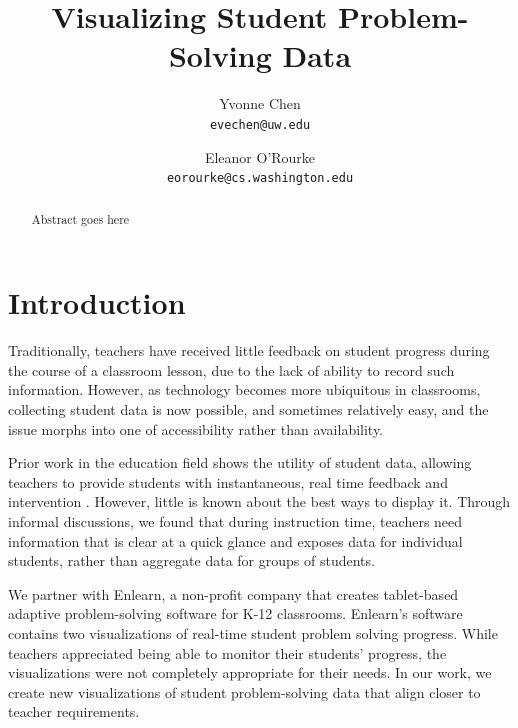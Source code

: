 \documentclass{sigchi}
\begin{document}
\author{
  Yvonne Chen\\
  \texttt{evechen@uw.edu}
  \and
  Eleanor O'Rourke\\
  \texttt{eorourke@cs.washington.edu}
}
\title{Visualizing Student Problem-Solving Data}


\maketitle

\begin{abstract}
Abstract goes here
\end{abstract}




\section{Introduction}

Traditionally, teachers have received little feedback on student progress during the course of a classroom lesson, due to the lack of ability to record such information. However, as technology becomes more ubiquitous in classrooms, collecting student data is now possible, and sometimes relatively easy, and the issue morphs into one of accessibility rather than availability.

Prior work in the education field shows the utility of student data, allowing teachers to provide students with instantaneous, real time feedback and intervention \cite{Balaam2010, Koile2006, Lazar2007}. However, little is known about the best ways to display it. Through informal discussions, we found that during instruction time, teachers need information that is clear at a quick glance and exposes data for individual students, rather than aggregate data for groups of students. 

We partner with Enlearn, a non-profit company that creates tablet-based adaptive problem-solving software for K-12 classrooms. Enlearn's software contains two visualizations of real-time student problem solving progress. While teachers appreciated being able to monitor their students' progress, the visualizations were not completely appropriate for their needs. In our work, we create new visualizations of student problem-solving data that align closer to teacher requirements. 
\end{document}
